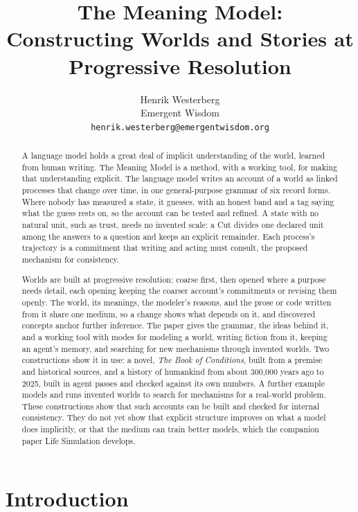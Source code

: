 \documentclass[11pt,a4paper]{article}
\title{The Meaning Model:\\Constructing Worlds and Stories at Progressive Resolution}
\author{Henrik Westerberg\\Emergent Wisdom\\
  \texttt{henrik.westerberg@emergentwisdom.org}}
\begin{document}
\maketitle

\begin{abstract}
A language model holds a great deal of implicit understanding of the world,
learned from human writing. The Meaning Model is a method, with a working tool,
for making that understanding explicit. The language model writes an account of a
world as linked processes that change over time, in one general-purpose grammar of
six record forms. Where nobody has measured a state, it guesses, with an honest
band and a tag saying what the guess rests on, so the account can be tested and
refined. A state with no natural unit, such as trust, needs no invented scale: a
Cut divides one declared unit among the answers to a question and keeps an
explicit remainder. Each process's trajectory is a commitment that writing and
acting must consult, the proposed mechanism for consistency.

Worlds are built at progressive resolution: coarse first, then opened where a
purpose needs detail, each opening keeping the coarser account's commitments or
revising them openly. The world, its meanings, the modeler's reasons, and the
prose or code written from it share one medium, so a change shows what depends on
it, and discovered concepts anchor further inference. The paper gives the grammar, the ideas behind it, and a working tool with modes
for modeling a world, writing fiction from it, keeping an agent's memory, and
searching for new mechanisms through invented worlds. Two constructions show it in
use: a novel, \emph{The Book of Conditions}, built from a premise and historical
sources, and a history of humankind from about 300,000 years ago to 2025, built in
agent passes and checked against its own numbers. A further example models and runs invented worlds to search for mechanisms for a
real-world problem. These constructions
show that such accounts can be built and checked for internal consistency. They do not
yet show that explicit structure improves on what a model does implicitly, or that
the medium can train better models, which the companion paper Life Simulation
develops.
\end{abstract}


\section{Introduction}
\label{sec:introduction}
\end{document}
